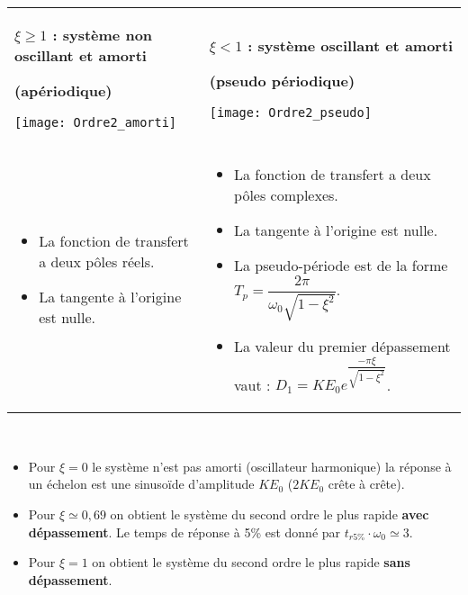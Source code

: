 \begin{resultat}
\begin{center}
\begin{tabular}{p{.4\linewidth}p{.58\linewidth}}
\begin{center}
\textbf{$\xi \geq 1$ : système non oscillant et amorti}

\textbf{(apériodique)}

\texttt{[image: Ordre2\_amorti]}
\end{center} 
& 
\begin{center}
\textbf{$\xi <1$ : système oscillant et amorti }

\textbf{(pseudo périodique)}

\texttt{[image: Ordre2\_pseudo]}
\end{center} 
\\
\vspace*{-1cm}
\begin{itemize} 
\item La fonction de transfert a deux pôles réels.
\item La tangente à l'origine est nulle.
\end{itemize}
& 
\vspace*{-.8cm}
\begin{itemize} 
\item La fonction de transfert a deux pôles complexes.
\item La tangente à l'origine est nulle.
\item La pseudo-période est de la forme $T_p=\dfrac{2\pi }{\omega_0 \sqrt{1-\xi^2}}$.
\item La valeur du premier dépassement vaut :  $D_1=KE_0e^{\dfrac{-\pi \xi }{\sqrt{1-\xi^2}}}$.
\end{itemize}
\end{tabular}
\end{center}
\end{resultat}

\begin{resultat} ~\\
\vspace{-.2cm}
\begin{itemize}
\item Pour $\xi=0$ le système n'est pas amorti (oscillateur harmonique) la réponse à un échelon est une sinusoïde d'amplitude $KE_0$ ($2KE_0$ crête à crête).  
\item Pour $\xi\simeq 0,69$  on obtient le système du second ordre le plus rapide \textbf{avec dépassement}. 
Le temps de réponse à 5\% est donné par $t_{r 5\%} \cdot \omega_0 \simeq 3$.
\item Pour $\xi =1$ on obtient le système du second ordre le plus rapide \textbf{sans dépassement}.

\end{itemize}
\end{resultat}

